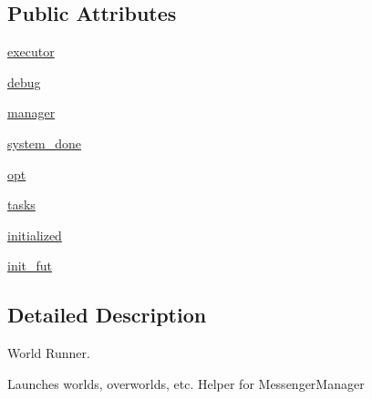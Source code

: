 \subsection*{Public Attributes}
\begin{DoxyCompactItemize}
\item 
\hyperlink{classparlai_1_1chat__service_1_1services_1_1messenger_1_1world__runner_1_1MessengerWorldRunner_aceef013023890c5d9590289d8039adbb}{executor}
\item 
\hyperlink{classparlai_1_1chat__service_1_1services_1_1messenger_1_1world__runner_1_1MessengerWorldRunner_a2f850eb160165940f64fdec3f0a8af8f}{debug}
\item 
\hyperlink{classparlai_1_1chat__service_1_1services_1_1messenger_1_1world__runner_1_1MessengerWorldRunner_a93b2e11a3222ab28f53520b30e72fd7c}{manager}
\item 
\hyperlink{classparlai_1_1chat__service_1_1services_1_1messenger_1_1world__runner_1_1MessengerWorldRunner_af1c6f26b752a0bcfd4c86c3d963bfe72}{system\+\_\+done}
\item 
\hyperlink{classparlai_1_1chat__service_1_1services_1_1messenger_1_1world__runner_1_1MessengerWorldRunner_a42ff6ed9074e14be34091499649f6935}{opt}
\item 
\hyperlink{classparlai_1_1chat__service_1_1services_1_1messenger_1_1world__runner_1_1MessengerWorldRunner_abadbc6d1ea38c2281e6bd1b893425671}{tasks}
\item 
\hyperlink{classparlai_1_1chat__service_1_1services_1_1messenger_1_1world__runner_1_1MessengerWorldRunner_a688d3920aa8dc6a7a5e31d0968e5c718}{initialized}
\item 
\hyperlink{classparlai_1_1chat__service_1_1services_1_1messenger_1_1world__runner_1_1MessengerWorldRunner_a0f3ae4787645f946c6a34ebce8fa4e42}{init\+\_\+fut}
\end{DoxyCompactItemize}


\subsection{Detailed Description}
\begin{DoxyVerb}World Runner.

Launches worlds, overworlds, etc. Helper for MessengerManager
\end{DoxyVerb}
 

